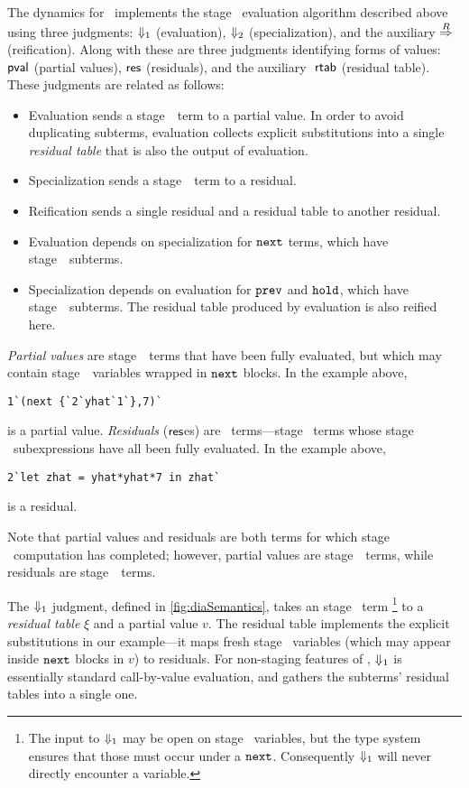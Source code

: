 

The dynamics for \lang\ implements the stage \bbone\ evaluation algorithm
described above using three judgments: ${\Downarrow_{ 1}}$ (evaluation), ${\Downarrow_{ 2}}$
(specialization), and the auxiliary $\overset{R}\Rightarrow$ (reification). 
Along with these are three judgments identifying forms of values:
$\mathsf{pval}$ (partial values), $\mathsf{res}$ (residuals), 
and the auxiliary $\ \mathsf{rtab}$ (residual table).
These judgments are related as follows:
\begin{itemize}
\item Evaluation sends a stage~\bbone\ term to a partial value.
In order to avoid duplicating subterms, evaluation collects explicit
substitutions into a single {\em residual table} that is also the output of
evaluation.
\item Specialization sends a stage~\bbtwo\ term to a residual.
\item Reification sends a single residual and a residual table to another residual.  
\item Evaluation depends on specialization for ${\tt next}$ terms, which have
stage~\bbtwo\ subterms.
\item Specialization depends on evaluation for ${\tt prev}$ and ${\tt hold}$, which have
stage~\bbone\ subterms. The residual table produced by evaluation is also
reified here.
\end{itemize}

\emph{Partial values} are stage~\bbone\ terms that have been fully
evaluated, but which may contain stage~\bbtwo\ variables wrapped in ${\tt next}$
blocks.  In the example above, 
\begin{lstlisting} 
1`(next {`2`yhat`1`},7)`
\end{lstlisting}
is a partial value.
\emph{Residuals} ($\mathsf{res}$es) are \langTwo\ terms---stage \bbtwo\ terms whose
stage \bbone\ subexpressions have all been fully evaluated. In the example
above,
\begin{lstlisting} 
2`let zhat = yhat*yhat*7 in zhat`
\end{lstlisting}
is a residual.

Note that partial values and residuals are both terms for which stage \bbone\
computation has completed; however, partial values are stage~\bbone\ terms,
while residuals are stage~\bbtwo\ terms.

The ${\Downarrow_{ 1}}$ judgment, defined in \ref{fig:diaSemantics}, takes an stage
\bbone\ term%
\footnote{ The input to ${\Downarrow_{ 1}}$ may be open on stage \bbtwo\ variables, but
the type system ensures that those must occur under a ${\tt next}$. Consequently
${\Downarrow_{ 1}}$ will never directly encounter a variable.}
%
to a {\em residual table} $\xi$ and a partial value $v$. The residual
table implements the explicit substitutions in our example---it maps fresh
stage \bbtwo\ variables (which may appear inside ${\tt next}$ blocks in $v$) to
residuals. For non-staging features of \lang, ${\Downarrow_{ 1}}$ is essentially
standard call-by-value evaluation, and gathers the subterms' residual tables
into a single one.

